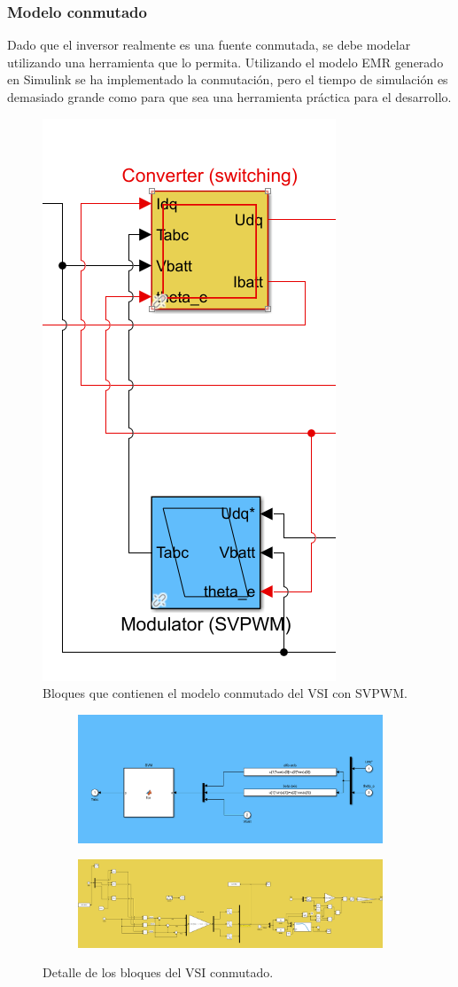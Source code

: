\subsubsection{Modelo conmutado}

Dado que el inversor realmente es una fuente conmutada, se debe modelar utilizando una herramienta que lo permita. Utilizando el modelo EMR generado en Simulink se ha implementado la conmutación, pero el tiempo de simulación es demasiado grande como para que sea una herramienta práctica para el desarrollo.

\begin{figure}[H]
    \centering
    \includegraphics[width=0.25\linewidth]{fig/EMR_VSIsw_out.png}
    \caption{Bloques que contienen el modelo conmutado del VSI con SVPWM.}
    
\end{figure}

\begin{figure}[H]
    \centering

    \begin{subfigure}{0.75\linewidth}
        \centering
        \includegraphics[width=\linewidth]{fig/EMR_VSIsw_in1.png}   
    \end{subfigure}
    \begin{subfigure}{0.75\linewidth}
        \centering
        \includegraphics[width=\linewidth]{fig/EMR_VSIsw_in2.png}
    \end{subfigure}
    \caption{Detalle de los bloques del VSI conmutado.}

\end{figure}

